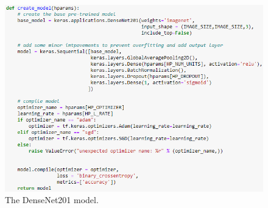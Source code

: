 \begin{figure}[H]
    \centering
    \includegraphics[width=\textwidth]{figures/densenet-model.png}
    \caption{The DenseNet201 model.}
    \label{fig:densenet-model}
\end{figure}